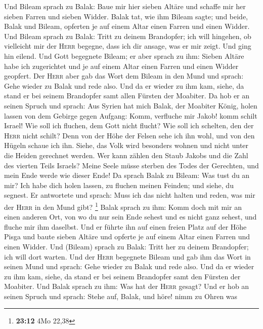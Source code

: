  Und Bileam sprach zu Balak: Baue mir hier sieben Altäre
und schaffe mir her sieben Farren und sieben Widder. 
Balak tat, wie ihm Bileam sagte; und beide, Balak und Bileam, opferten
je auf einem Altar einen Farren und einen Widder.  Und
Bileam sprach zu Balak: Tritt zu deinem Brandopfer; ich will hingehen,
ob vielleicht mir der \textsc{Herr} begegne, dass ich dir ansage, was er
mir zeigt. Und ging hin eilend.  Und Gott begegnete
Bileam; er aber sprach zu ihm: Sieben Altäre habe ich zugerichtet und je
auf einem Altar einen Farren und einen Widder geopfert. 
Der \textsc{Herr} aber gab das Wort dem Bileam in den Mund und sprach:
Gehe wieder zu Balak und rede also.  Und da er wieder zu
ihm kam, siehe, da stand er bei seinem Brandopfer samt allen Fürsten der
Moabiter.  Da hob er an seinen Spruch und sprach: Aus
Syrien hat mich Balak, der Moabiter König, holen lassen von dem Gebirge
gegen Aufgang: Komm, verfluche mir Jakob! komm schilt Israel!
 Wie soll ich fluchen, dem Gott nicht flucht? Wie soll ich
schelten, den der \textsc{Herr} nicht schilt?  Denn von
der Höhe der Felsen sehe ich ihn wohl, und von den Hügeln schaue ich
ihn. Siehe, das Volk wird besonders wohnen und nicht unter die Heiden
gerechnet werden.  Wer kann zählen den Staub Jakobs und
die Zahl des vierten Teils Israels? Meine Seele müsse sterben des Todes
der Gerechten, und mein Ende werde wie dieser Ende!  Da
sprach Balak zu Bileam: Was tust du an mir? Ich habe dich holen lassen,
zu fluchen meinen Feinden; und siehe, du segnest.  Er
antwortete und sprach: Muss ich das nicht halten und reden, was mir der
\textsc{Herr} in den Mund gibt? \footnote{\textbf{23:12} 4Mo 22,38}
 Balak sprach zu ihm: Komm doch mit mir an einen anderen
Ort, von wo du nur sein Ende sehest und es nicht ganz sehest, und fluche
mir ihm daselbst.  Und er führte ihn auf einen freien
Platz auf der Höhe Pisga und baute sieben Altäre und opferte je auf
einem Altar einen Farren und einen Widder.  Und (Bileam)
sprach zu Balak: Tritt her zu deinem Brandopfer; ich will dort warten.
 Und der \textsc{Herr} begegnete Bileam und gab ihm das
Wort in seinen Mund und sprach: Gehe wieder zu Balak und rede also.
 Und da er wieder zu ihm kam, siehe, da stand er bei
seinem Brandopfer samt den Fürsten der Moabiter. Und Balak sprach zu
ihm: Was hat der \textsc{Herr} gesagt?  Und er hob an
seinen Spruch und sprach: Stehe auf, Balak, und höre! nimm zu Ohren was
